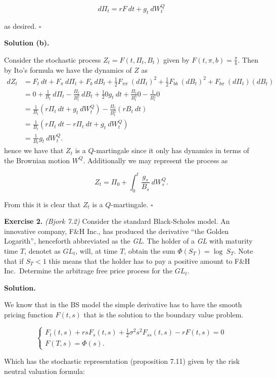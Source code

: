 \documentclass[a4paper,12pt,openany]{book}
\begin{document}
\[
d\Pi_t=r F\ dt+g_t\ dW^Q_t
\]

as desired. \(\square\)

\textbf{Solution (b).}

Consider the stochastic process \(Z_t=F(t,\Pi_t,B_t)\) given by \(F(t,\pi,b)=\frac{\pi}{b}\). Then by Ito's formula we have the dynamics of \(Z\) as
\begin{align*}
dZ_t&=F_t\ dt+F_\pi\ d\Pi_t+F_b\ dB_t+\frac{1}{2}F_{\pi\pi}\ (d\Pi_t)^2+\frac{1}{2}F_{bb}\ (dB_t)^2+F_{b\pi}\ (d\Pi_t)(dB_t)\\
&=0+\frac{1}{B_t}\ d\Pi_t-\frac{\Pi_t}{B_t^2}\ dB_t+\frac{1}{2}0g_t\ dt+\frac{\Pi_t}{B_t^3}0-\frac{1}{B_t^2}0\\
&=\frac{1}{B_t}(r \Pi_t\ dt + g_t\ dW^Q_t)-\frac{\Pi_t}{B_t^2}(rB_t\ dt)\\
&=\frac{1}{B_t}(r\Pi_t\ dt-r\Pi_t\ dt+g_t\ dW_t^Q)\\
&=\frac{1}{B_t}g_t\ dW_t^Q.
\end{align*}
hence we have that \(Z_t\) is a \(Q\)-martingale since it only has dynamics in terms of the Brownian motion \(W^Q\). Additionally we may represent the process as

\[
Z_t=\Pi_0+\int_0^t\frac{g_s}{B_s}\ dW_s^Q.
\]

From this it is clear that \(Z_t\) is a \(Q\)-martingale. \(\square\)

\textbf{Exercise 2.} \emph{(Bjork 7.2)} Consider the standard Black-Scholes model. An innovative company, F\&H Inc., has produced the derivative ``the Golden Logarith'', henceforth abbreviated as the \emph{GL}. The holder of a \emph{GL} with maturity time \(T\), denotet as \(GL_t\), will, at time \(T\), obtain the sum \(\Phi(S_T)=\log\ S_T\). Note that if \(S_T<1\) this means that the holder has to pay a positive amount to F\&H Inc.~Determine the arbitrage free price process for the \(GL_t\).

\textbf{Solution.}

We know that in the BS model the simple derivative has to have the smooth pricing function \(F(t,s)\) that is the solution to the boundary value problem.

\[
\left\{
\begin{matrix}
F_t(t,s) + rsF_s(t,s)+\frac{1}{2}\sigma^2 s^2F_{ss}(t,s)-rF(t,s)=0\\
F(T,s)=\Phi(s).
\end{matrix}
\right.
\]

Which has the stochastic representation (proposition 7.11) given by the risk neutral valuation formula:
\end{document}
